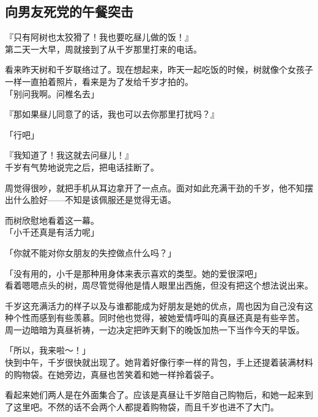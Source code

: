 \subsection{向男友死党的午餐突击}

『只有阿树也太狡猾了！我也要吃昼儿做的饭！』\\

第二天一大早，周就接到了从千岁那里打来的电话。

看来昨天树和千岁联络过了。现在想起来，昨天一起吃饭的时候，树就像个女孩子一样一直拍着照片，看来是为了发给千岁才拍的。\\

「别问我啊。问椎名去」

『那如果昼儿同意了的话，我也可以去你那里打扰吗？』

「行吧」

『我知道了！我这就去问昼儿！』\\

千岁有气势地说完之后，把电话挂断了。

周觉得很吵，就把手机从耳边拿开了一点点。面对如此充满干劲的千岁，他不知摆出什么脸好——不知是该佩服还是觉得无语。

而树欣慰地看着这一幕。\\

「小千还真是有活力呢」

「你就不能对你女朋友的失控做点什么吗？」

「没有用的，小千是那种用身体来表示喜欢的类型。她的爱很深吧」\\

看着嗯嗯点头的树，周尽管觉得他是情人眼里出西施，但没有把这个想法说出来。

千岁这充满活力的样子以及与谁都能成为好朋友是她的优点，周也因为自己没有这种个性而感到有些羡慕。同时他也觉得，被她爱情呼叫的真昼还真是有些辛苦。\\

周一边暗暗为真昼祈祷，一边决定把昨天剩下的晚饭加热一下当作今天的早饭。\\

\vspace{2\baselineskip}

「所以，我来啦～！」\\

快到中午，千岁很快就出现了。她背着好像行李一样的背包，手上还提着装满材料的购物袋。在她旁边，真昼也苦笑着和她一样拎着袋子。

看起来她们两人是在外面集合了。应该是真昼让千岁陪自己购物后，和她一起来到了这里吧。不然的话不会两个人都提着购物袋，而且千岁也进不了大门。\\

